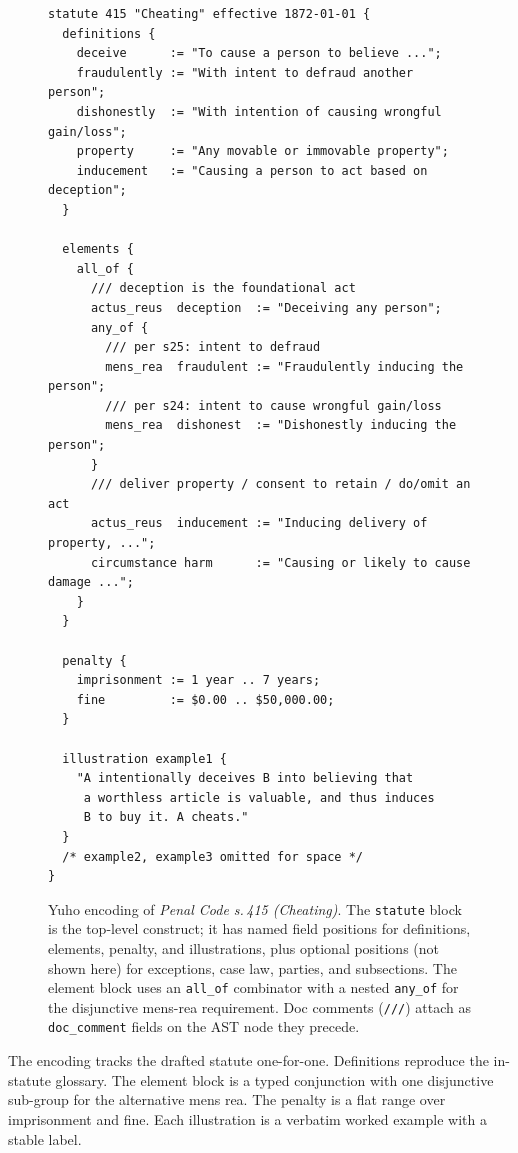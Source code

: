 \begin{figure}[!htbp]
\begin{lstlisting}[language=yuho,basicstyle=\ttfamily\scriptsize]
statute 415 "Cheating" effective 1872-01-01 {
  definitions {
    deceive      := "To cause a person to believe ...";
    fraudulently := "With intent to defraud another person";
    dishonestly  := "With intention of causing wrongful gain/loss";
    property     := "Any movable or immovable property";
    inducement   := "Causing a person to act based on deception";
  }

  elements {
    all_of {
      /// deception is the foundational act
      actus_reus  deception  := "Deceiving any person";
      any_of {
        /// per s25: intent to defraud
        mens_rea  fraudulent := "Fraudulently inducing the person";
        /// per s24: intent to cause wrongful gain/loss
        mens_rea  dishonest  := "Dishonestly inducing the person";
      }
      /// deliver property / consent to retain / do/omit an act
      actus_reus  inducement := "Inducing delivery of property, ...";
      circumstance harm      := "Causing or likely to cause damage ...";
    }
  }

  penalty {
    imprisonment := 1 year .. 7 years;
    fine         := $0.00 .. $50,000.00;
  }

  illustration example1 {
    "A intentionally deceives B into believing that
     a worthless article is valuable, and thus induces
     B to buy it. A cheats."
  }
  /* example2, example3 omitted for space */
}
\end{lstlisting}
\caption{Yuho encoding of \emph{Penal Code s.\,415 (Cheating)}. The
\texttt{statute} block is the top-level construct; it has named field
positions for definitions, elements, penalty, and illustrations, plus
optional positions (not shown here) for exceptions, case law, parties,
and subsections. The element block uses an \texttt{all\_of} combinator
with a nested \texttt{any\_of} for the disjunctive mens-rea requirement.
Doc comments (\texttt{///}) attach as \texttt{doc\_comment} fields on
the AST node they precede.}
\label{fig:s415}
\end{figure}

The encoding tracks the drafted statute one-for-one. Definitions reproduce
the in-statute glossary. The element block is a typed conjunction with
one disjunctive sub-group for the alternative mens rea. The penalty is a
flat range over imprisonment and fine. Each illustration is a verbatim
worked example with a stable label.


